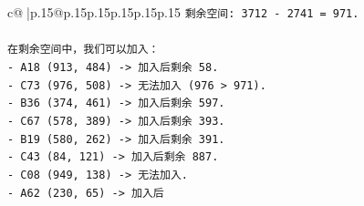 \documentclass{article}
\begin{document}
{\begin{supertabular}{c@{$\;$}|p{.15\linewidth}@{}p{.15\linewidth}p{.15\linewidth}p{.15\linewidth}p{.15\linewidth}p{.15\linewidth}}
{{{\texttt{剩余空间: 3712 {-} 2741 = 971.} \\
\\ 
\texttt{在剩余空间中，我们可以加入：} \\
\texttt{{-} A18 (913, 484) {-}> 加入后剩余 58.} \\
\texttt{{-} C73 (976, 508) {-}> 无法加入 (976 > 971).} \\
\texttt{{-} B36 (374, 461) {-}> 加入后剩余 597.} \\
\texttt{{-} C67 (578, 389) {-}> 加入后剩余 393.} \\
\texttt{{-} B19 (580, 262) {-}> 加入后剩余 391.} \\
\texttt{{-} C43 (84, 121) {-}> 加入后剩余 887.} \\
\texttt{{-} C08 (949, 138) {-}> 无法加入.} \\
\texttt{{-} A62 (230, 65) {-}> 加入后} \\
            }
        }
    }
     \\ \\


\end{supertabular}}
\end{document}
